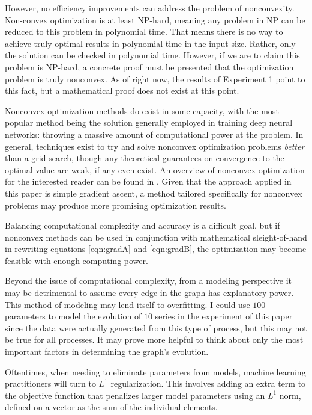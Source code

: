 \documentclass[12pt]{article}
\theoremstyle{definition}
\begin{document}
However, no efficiency improvements can address the problem of nonconvexity. Non-convex optimization is at least NP-hard, meaning any problem in NP can be reduced to this problem in polynomial time. That means there is no way to achieve truly optimal results in polynomial time in the input size. Rather, only the solution can be checked in polynomial time. However, if we are to claim this problem is NP-hard, a concrete proof must be presented that the optimization problem is truly nonconvex. As of right now, the results of Experiment 1 point to this fact, but a mathematical proof does not exist at this point.

Nonconvex optimization methods do exist in some capacity, with the most popular method being the solution generally employed in training deep neural networks: throwing a massive amount of computational power at the problem. In general, techniques exist to try and solve nonconvex optimization problems \textit{better} than a grid search, though any theoretical guarantees on convergence to the optimal value are weak, if any even exist. An overview of nonconvex optimization for the interested reader can be found in \cite{JainNonConvexOptimization}. Given that the approach applied in this paper is simple gradient ascent, a method tailored specifically for nonconvex problems may produce more promising optimization results. 

Balancing computational complexity and accuracy is a difficult goal, but if nonconvex methods can be used in conjunction with mathematical sleight-of-hand in rewriting equations \ref{eqn:gradA} and \ref{eqn:gradB}, the optimization may become feasible with enough computing power. 

Beyond the issue of computational complexity, from a modeling perspective it may be detrimental to assume every edge in the graph has explanatory power. This method of modeling may lend itself to overfitting. I could use $100$ parameters to model the evolution of $10$ series in the experiment of this paper since the data were actually generated from this type of process, but this may not be true for all processes. It may prove more helpful to think about only the most important factors in determining the graph's evolution.

Oftentimes, when needing to eliminate parameters from models, machine learning practitioners will turn to $L^1$ regularization. This involves adding an extra term to the objective function that penalizes larger model parameters using an $L^1$ norm, defined on a vector as the sum of the individual elements.
\end{document}
